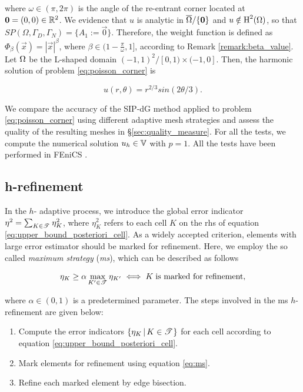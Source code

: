 \documentclass[a4paper,11pt]{article}
\begin{document}
where $\omega \in (\pi,2\pi)$ is the angle of the re-entrant corner located at $\boldsymbol 0 = (0,0) \in \mathbb R^{2}$. 
We evidence that $u$ is analytic in $\overline{\Omega}\slash\{\boldsymbol 0\}$ and $u \notin \operatorname H^{2}(\Omega)$, so that $\textit{SP}(\Omega,\Gamma_{D},\Gamma_{N}) = \{A_{1} := \vec{0}\}$. Therefore, the weight function is defined as $\Phi_{\beta}(\vec{x}) = |\vec{x}|^{\beta}$, where $\beta \in (1 - \frac{\pi}{\omega},1]$, according to Remark \ref{remark:beta_value}. Let $\Omega$ be the L-shaped domain $ (-1,1)^{2} \slash [0,1) \times (-1,0]$. Then, the harmonic solution of problem \eqref{eq:poisson_corner} is 

\begin{equation}
    u(r,\theta) = r^{2/3} sin(2\theta/3).
\label{eq:exact_solution_laplace}
\end{equation}

We compare the accuracy of the SIP-dG method applied to problem \eqref{eq:poisson_corner} using different adaptive mesh strategies and assess the quality of the resulting meshes in \S \ref{sec:quality_measure}. For all the tests, we compute the numerical solution $u_{h} \in \mathbb V$ with $p=1$. All the tests have been performed in FEniCS \cite{Logg:2010}.

\subsection{h-refinement}

In the $h$- adaptive process, we introduce the global error indicator $\eta^{2} = \sum_{K \in \mathscr T^{}} \eta_{K}^{2}$, where $\eta_{K}^{2}$ refers to each cell $K$ on the rhs of equation \eqref{eq:upper_bound_posteriori_cell}. As a widely accepted criterion, elements with large error estimator should be marked for refinement. Here, we employ the so called \textit{maximum strategy} (\textit{ms}), which can be described as follows

\begin{equation}
    \eta_{K} \geq \alpha \max_{K' \in \mathscr T^{}} \eta_{K'} \iff K \; \text{is marked for refinement},
\label{eq:ms}
\end{equation}

where $\alpha \in (0,1)$ is a predetermined parameter. The steps involved in the ms $h$-refinement are given below:

\begin{enumerate}
    \item Compute the error indicators $\{ \eta_{K} \, | \, K \in \mathscr T^{}  \}$ for each cell according to equation \eqref{eq:upper_bound_posteriori_cell}.

    \item Mark elements for refinement using equation \eqref{eq:ms}.
    
    \item Refine each marked element by edge bisection.
    
\end{enumerate}
\end{document}
